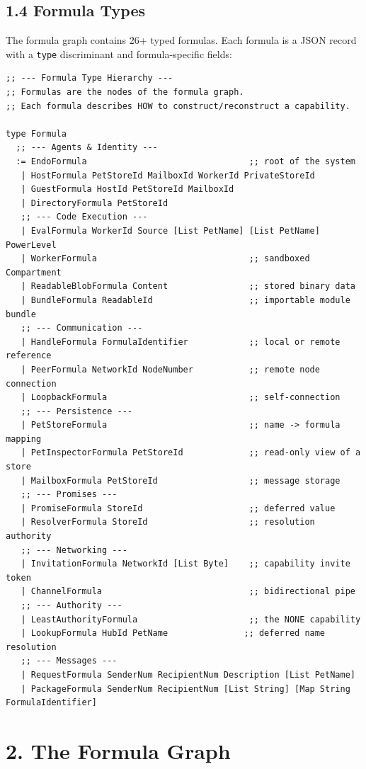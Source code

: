 \documentclass[11pt]{article}
\begin{document}
\subsection{1.4 Formula Types}
\label{sec:org997fb0e}

The formula graph contains 26+ typed formulas. Each formula is a JSON record
with a \texttt{type} discriminant and formula-specific fields:

\begin{verbatim}
;; --- Formula Type Hierarchy ---
;; Formulas are the nodes of the formula graph.
;; Each formula describes HOW to construct/reconstruct a capability.

type Formula
  ;; --- Agents & Identity ---
  := EndoFormula                                ;; root of the system
   | HostFormula PetStoreId MailboxId WorkerId PrivateStoreId
   | GuestFormula HostId PetStoreId MailboxId
   | DirectoryFormula PetStoreId
   ;; --- Code Execution ---
   | EvalFormula WorkerId Source [List PetName] [List PetName] PowerLevel
   | WorkerFormula                              ;; sandboxed Compartment
   | ReadableBlobFormula Content                ;; stored binary data
   | BundleFormula ReadableId                   ;; importable module bundle
   ;; --- Communication ---
   | HandleFormula FormulaIdentifier            ;; local or remote reference
   | PeerFormula NetworkId NodeNumber           ;; remote node connection
   | LoopbackFormula                            ;; self-connection
   ;; --- Persistence ---
   | PetStoreFormula                            ;; name -> formula mapping
   | PetInspectorFormula PetStoreId             ;; read-only view of a store
   | MailboxFormula PetStoreId                  ;; message storage
   ;; --- Promises ---
   | PromiseFormula StoreId                     ;; deferred value
   | ResolverFormula StoreId                    ;; resolution authority
   ;; --- Networking ---
   | InvitationFormula NetworkId [List Byte]    ;; capability invite token
   | ChannelFormula                             ;; bidirectional pipe
   ;; --- Authority ---
   | LeastAuthorityFormula                      ;; the NONE capability
   | LookupFormula HubId PetName               ;; deferred name resolution
   ;; --- Messages ---
   | RequestFormula SenderNum RecipientNum Description [List PetName]
   | PackageFormula SenderNum RecipientNum [List String] [Map String FormulaIdentifier]
\end{verbatim}
\section{2. The Formula Graph}
\label{sec:orgd41f91f}
\end{document}
